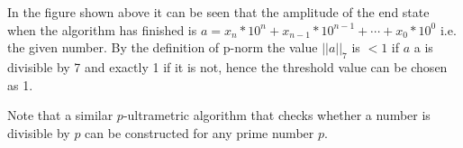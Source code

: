 \documentclass{llncs}
\begin{document}
In the figure shown above it can be seen that the amplitude of the end state when the algorithm has finished is $a=x_n*10^n+x_{n-1}*10^{n-1}+\cdots+x_0*10^0$ i.e. the given number. By the definition of p-norm the value $||a||_7$ is $<1$ if $a$ a is divisible by 7 and exactly 1 if it is not, hence the threshold value can be chosen as 1.

Note that a similar $p$-ultrametric algorithm that checks whether a number is divisible by $p$ can be constructed for any prime number $p$.
%




\end{document}
